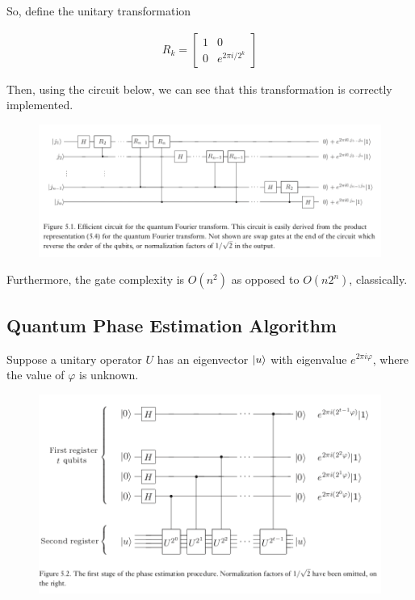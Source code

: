 \documentclass[11pt]{article}
\newcommand\0{\mathbf{0}}
\newcommand\<{\langle}
\renewcommand\>{\rangle}
\renewcommand\phi{\varphi}
\begin{document}
So, define the unitary transformation

\begin{align}
	R_k = \begin{bmatrix}
 1 & 0 \\ 0 & e^{2\pi i / 2^k}	
 \end{bmatrix}
\end{align}

Then, using the circuit below, we can see that this transformation is correctly implemented.

\begin{figure}[H]
\centering
\includegraphics[width=\linewidth]{images/qfft.png}	
\end{figure}

Furthermore, the gate complexity is $O(n^2)$ as opposed to $O(n2^n)$, classically. 

\subsection{Quantum Phase Estimation Algorithm}\label{phase_estimation}

Suppose a unitary operator $U$ has an eigenvector $\ket{u}$ with eigenvalue $e^{2\pi i \phi}$, where the value of $\phi$ is unknown. 

\begin{figure}[H]
\centering
\includegraphics[width=\linewidth]{images/phase_estim.png}	
\end{figure}
\end{document}
